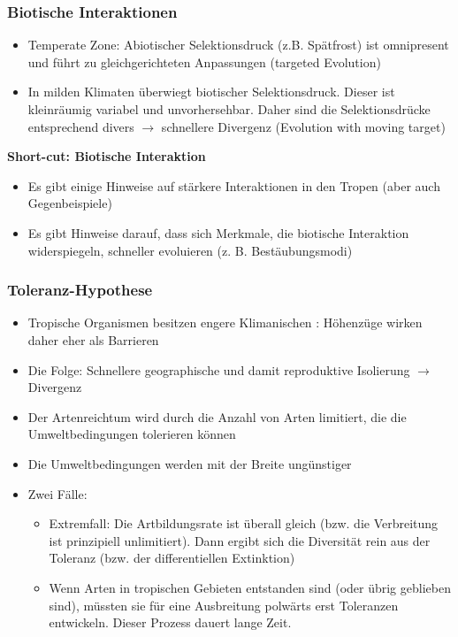 \subsubsection{Biotische Interaktionen}
\begin{itemize}
	\item Temperate Zone: Abiotischer Selektionsdruck (z.B. Spätfrost) ist omnipresent und führt zu gleichgerichteten Anpassungen (targeted Evolution)
	\item In milden Klimaten überwiegt biotischer Selektionsdruck. Dieser ist kleinräumig variabel und unvorhersehbar. Daher sind die Selektionsdrücke entsprechend divers $\rightarrow$ schnellere Divergenz (Evolution with moving target)
\end{itemize}

\textbf{Short-cut: Biotische Interaktion}
\begin{itemize}
	\item Es gibt einige Hinweise auf stärkere Interaktionen in den Tropen (aber auch Gegenbeispiele)
	\item Es gibt Hinweise darauf, dass sich Merkmale, die biotische Interaktion widerspiegeln, schneller evoluieren (z. B. Bestäubungsmodi)
\end{itemize}

\subsubsection{Toleranz-Hypothese}
\begin{itemize}
	\item Tropische Organismen besitzen engere Klimanischen : Höhenzüge wirken daher eher als Barrieren
	\item Die Folge: Schnellere geographische und damit reproduktive Isolierung $\rightarrow$ Divergenz
	\item Der Artenreichtum wird durch die Anzahl von Arten limitiert, die die Umweltbedingungen tolerieren können
	\item Die Umweltbedingungen werden mit der Breite ungünstiger
	\item Zwei Fälle:
	\begin{itemize}
		\item Extremfall: Die Artbildungsrate ist überall gleich (bzw. die Verbreitung ist prinzipiell unlimitiert). Dann ergibt sich die Diversität rein aus der Toleranz (bzw. der differentiellen Extinktion)
		\item Wenn Arten in tropischen Gebieten entstanden sind (oder übrig geblieben sind), müssten sie für eine Ausbreitung polwärts erst Toleranzen entwickeln. Dieser Prozess dauert lange Zeit.
	\end{itemize}
\end{itemize}

